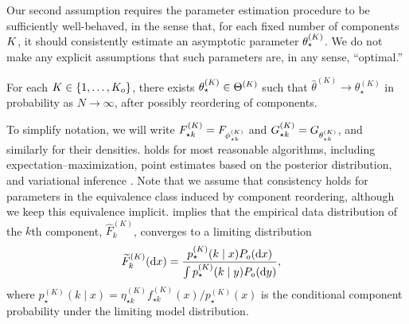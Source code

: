 Our second assumption requires the parameter estimation procedure to be sufficiently well-behaved,
in the sense that, for each fixed number of components $K$, it should consistently estimate an asymptotic parameter $\theta_{\star}^{(K)}$.
We do not make any explicit assumptions that such parameters are, in any sense, ``optimal.''

\begin{assumption}\label{assump:inference-regularity}
	For each $K \in \{1,\dots, K_{o}\}$, there exists $\theta_{\star}^{(K)} \in \Theta^{(K)}$ such that
	$\widehat\theta^{(K)} \to \theta_{\star}^{(K)}$ in probability as $N \rightarrow \infty$,
	after possibly reordering of components.
\end{assumption}
To simplify notation, we will write $F^{(K)}_{\star k} = F_{\phi^{(K)}_{\star k}}$ and $G^{(K)}_{\star k} = G_{\theta^{(K)}_{\star k}}$, and similarly for their densities.
 holds for most reasonable algorithms, including expectation--maximization, point estimates based on the posterior distribution,
and variational inference \citep{Balakrishnan:2017,Walker:2001,Wang:2019}.
Note that we assume that consistency holds for parameters in the equivalence class induced by component reordering, although we keep
this equivalence implicit.
 implies that the empirical data distribution of the $k$th component,
$\widehat{F}^{(K)}_k$, %
converges to a limiting distribution
\begin{align}
	\widetilde{F}^{(K)}_{k}(\dee x) & = \frac{p_{\star}^{(K)}(k\mid x)P_o(\dee x) }{\int p_{\star}^{(K)}(k\mid y)P_o(\dee y)}, \label{eq:phat-def}
\end{align}
where $p_{\star}^{(K)}(k \mid x) = \eta^{(K)}_{\star k}f_{\star k}^{(K)}(x)/p^{(K)}_{\star}(x)$ is the
conditional component probability under the limiting model distribution.

